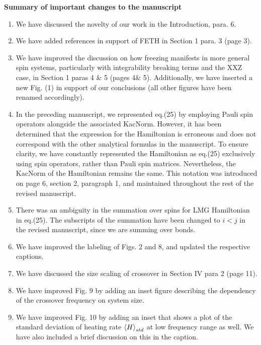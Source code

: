 \documentclass[aps,prb,reprint,showpacs,floatfix,superscriptaddress, onecolumn, nofootinbib, 9pt]{revtex4-2}
\begin{document}
	\vskip 1cm 
	\noindent \textbf{Summary of important changes to the  manuscript}
	\begin{enumerate}
		\item We have discussed the novelty of our work in the Introduction, para. 6.
		\item We have added references in support of FETH in Section 1 para. 3 (page 3).
		\item We have improved the discussion on how freezing manifests in more general spin systems, particularly with integrability breaking terms and the XXZ case, in Section 1 paras 4 \& 5 (pages 4\& 5). Additionally, we have inserted a new Fig. (1) in support of our conclusions (all other figures have been renamed accordingly).
		\item In the preceding manuscript, we represented eq.(25) by employing Pauli spin operators alongside the associated KacNorm. However, it has been determined that the expression for the Hamiltonian is erroneous and does not correspond with the other analytical formulas in the manuscript. To ensure clarity, we have constantly represented the Hamiltonian as eq.(25) exclusively using spin operators, rather than Pauli spin matrices. Nevertheless, the KacNorm of the Hamiltonian remains the same. This notation was introduced on page 6, section 2, paragraph 1, and maintained throughout the rest of the revised manuscript. 
		\item There was an ambiguity in the summation over spins for LMG Hamiltonian in eq.(25). The subscripts of the summation have been changed to $i<j$ in the revised manuscript, since we are summing over bonds.
		\item We have improved the labeling of Figs. 2 and 8, and updated the respective captions.
		\item We have discussed the size scaling of crossover in Section IV para 2 (page 11).
		\item We have improved Fig. 9 by adding an inset figure describing the dependency of the crossover frequency on system size.
		\item We have improved Fig. 10 by adding an inset that shows a plot of the standard deviation of heating rate $\expval{H}_{std}$ at low frequency range as well. We have also included a brief discussion on this in the caption.
	\end{enumerate}
	
	
	
	
\end{document}
